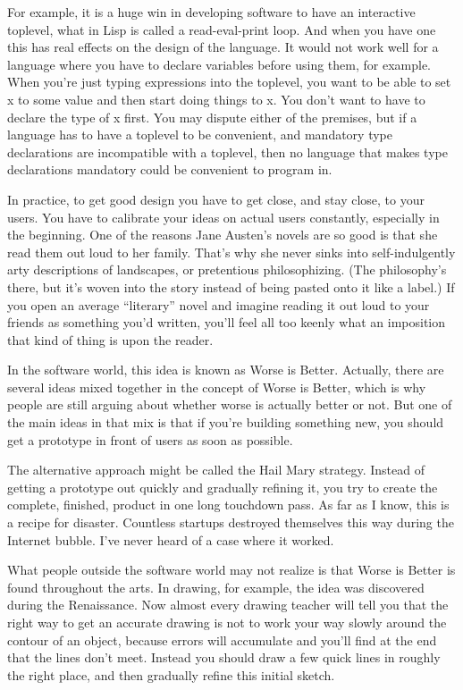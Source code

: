 For example, it is a huge win in developing software to have an
interactive toplevel, what in Lisp is called a read-eval-print loop. And
when you have one this has real effects on the design of the language.
It would not work well for a language where you have to declare
variables before using them, for example. When you're just typing
expressions into the toplevel, you want to be able to set x to some
value and then start doing things to x. You don't want to have to
declare the type of x first. You may dispute either of the premises, but
if a language has to have a toplevel to be convenient, and mandatory
type declarations are incompatible with a toplevel, then no language
that makes type declarations mandatory could be convenient to program
in.

In practice, to get good design you have to get close, and stay close,
to your users. You have to calibrate your ideas on actual users
constantly, especially in the beginning. One of the reasons Jane
Austen's novels are so good is that she read them out loud to her
family. That's why she never sinks into self-indulgently arty
descriptions of landscapes, or pretentious philosophizing. (The
philosophy's there, but it's woven into the story instead of being
pasted onto it like a label.) If you open an average ``literary'' novel
and imagine reading it out loud to your friends as something you'd
written, you'll feel all too keenly what an imposition that kind of
thing is upon the reader.

In the software world, this idea is known as Worse is Better. Actually,
there are several ideas mixed together in the concept of Worse is
Better, which is why people are still arguing about whether worse is
actually better or not. But one of the main ideas in that mix is that if
you're building something new, you should get a prototype in front of
users as soon as possible.

The alternative approach might be called the Hail Mary strategy. Instead
of getting a prototype out quickly and gradually refining it, you try to
create the complete, finished, product in one long touchdown pass. As
far as I know, this is a recipe for disaster. Countless startups
destroyed themselves this way during the Internet bubble. I've never
heard of a case where it worked.

What people outside the software world may not realize is that Worse is
Better is found throughout the arts. In drawing, for example, the idea
was discovered during the Renaissance. Now almost every drawing teacher
will tell you that the right way to get an accurate drawing is not to
work your way slowly around the contour of an object, because errors
will accumulate and you'll find at the end that the lines don't meet.
Instead you should draw a few quick lines in roughly the right place,
and then gradually refine this initial sketch.

